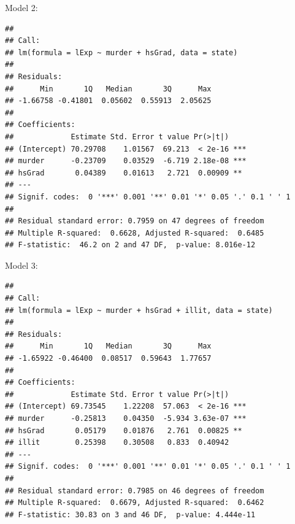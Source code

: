 \documentclass[ignorenonframetext,]{beamer}
\begin{document}
\begin{frame}[fragile]{Model 2:}

\begin{Verbatim}[fontsize=\small]
## 
## Call:
## lm(formula = lExp ~ murder + hsGrad, data = state)
## 
## Residuals:
##      Min       1Q   Median       3Q      Max 
## -1.66758 -0.41801  0.05602  0.55913  2.05625 
## 
## Coefficients:
##             Estimate Std. Error t value Pr(>|t|)    
## (Intercept) 70.29708    1.01567  69.213  < 2e-16 ***
## murder      -0.23709    0.03529  -6.719 2.18e-08 ***
## hsGrad       0.04389    0.01613   2.721  0.00909 ** 
## ---
## Signif. codes:  0 '***' 0.001 '**' 0.01 '*' 0.05 '.' 0.1 ' ' 1
## 
## Residual standard error: 0.7959 on 47 degrees of freedom
## Multiple R-squared:  0.6628, Adjusted R-squared:  0.6485 
## F-statistic:  46.2 on 2 and 47 DF,  p-value: 8.016e-12
\end{Verbatim}

\end{frame}

\begin{frame}[fragile]{Model 3:}

\begin{Verbatim}[fontsize=\small]
## 
## Call:
## lm(formula = lExp ~ murder + hsGrad + illit, data = state)
## 
## Residuals:
##      Min       1Q   Median       3Q      Max 
## -1.65922 -0.46400  0.08517  0.59643  1.77657 
## 
## Coefficients:
##             Estimate Std. Error t value Pr(>|t|)    
## (Intercept) 69.73545    1.22208  57.063  < 2e-16 ***
## murder      -0.25813    0.04350  -5.934 3.63e-07 ***
## hsGrad       0.05179    0.01876   2.761  0.00825 ** 
## illit        0.25398    0.30508   0.833  0.40942    
## ---
## Signif. codes:  0 '***' 0.001 '**' 0.01 '*' 0.05 '.' 0.1 ' ' 1
## 
## Residual standard error: 0.7985 on 46 degrees of freedom
## Multiple R-squared:  0.6679, Adjusted R-squared:  0.6462 
## F-statistic: 30.83 on 3 and 46 DF,  p-value: 4.444e-11
\end{Verbatim}

\end{frame}
\end{document}
